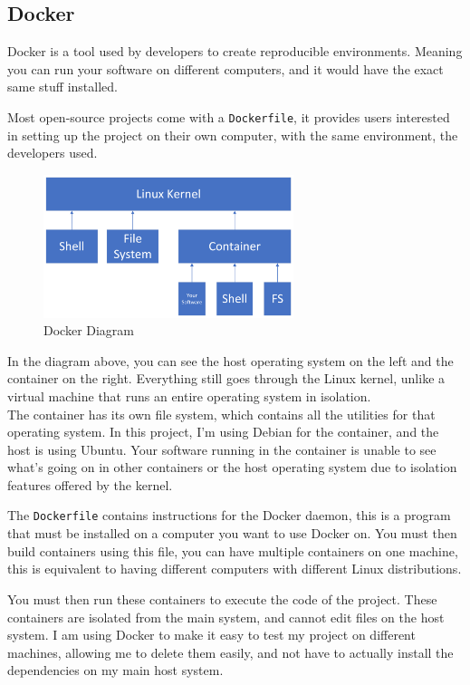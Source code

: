 \subsection{Docker}
Docker is a tool used by developers to create reproducible environments. \cite{docker}
Meaning you can run your software on different computers,
and it would have the exact same stuff installed.

Most open-source projects come with a \texttt{Dockerfile}, it provides
users interested in setting up the project on their own computer,
with the same environment, the developers used.

\begin{figure}[h!]
    \centering
    \label{image:dockerDiagram}
    \includegraphics[width=0.65\textwidth]{images/diagrams/docker}
    \caption{Docker Diagram}
\end{figure}

In the diagram above, you can see the host operating system
on the left and the container on the right.
Everything still goes through the Linux kernel,
unlike a virtual machine that runs an entire operating system in isolation. \\

The container has its own file system,
which contains all the utilities for that operating system.
In this project, I'm using Debian for the container,
and the host is using Ubuntu.
Your software running in the container is unable to see
what's going on in other containers or the host operating system
due to isolation features offered by the kernel.

The \texttt{Dockerfile} contains instructions for the Docker daemon,
this is a program that must be installed
on a computer you want to use Docker on.
You must then build containers using this file,
you can have multiple containers on one machine,
this is equivalent to having different computers with different Linux distributions.

You must then run these containers to
execute the code of the project.
These containers are isolated from the main system,
and cannot edit files on the host system.
I am using Docker to make it easy to test my project on different machines,
allowing me to delete them easily,
and not have to actually install the dependencies on my main host system.

